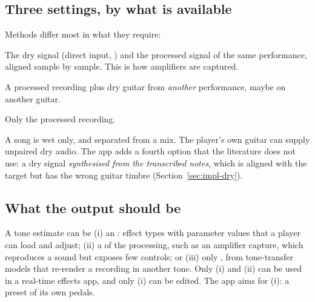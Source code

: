 \subsection{Three settings, by what is available}

Methods differ most in what they require:
\begin{description}[style=nextline,leftmargin=1.2cm]
\item[Paired] The dry signal (direct input, ) and the processed signal
  of the same performance, aligned sample by sample. This is how amplifiers are
  captured.
\item[Unpaired] A processed recording plus dry guitar from \emph{another}
  performance, maybe on another guitar.
\item[Wet only] Only the processed recording.
\end{description}
A song is wet only, and separated from a mix. The player's own guitar can
supply unpaired dry audio. The app adds a fourth option that the literature does
not use: a dry signal \emph{synthesised from the transcribed notes}, which is
aligned with the target but has the wrong guitar timbre
(Section~\ref{sec:impl-dry}).

\subsection{What the output should be}

A tone estimate can be (i) an : effect types with
parameter values that a player can load and adjust; (ii) a 
of the processing, such as an amplifier capture, which reproduces a sound but
exposes few controls; or (iii) only , from tone-transfer
models that re-render a recording in another tone. Only (i) and (ii) can be
used in a real-time effects app, and only (i) can be edited. The app aims for
(i): a preset of its own pedals.
